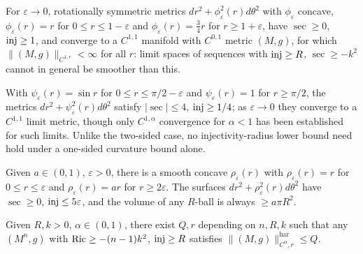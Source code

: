\begin{example}
  \label{ex:pet-ch11-optimality-lower-curvature-example}
  For $\varepsilon\to0$, rotationally symmetric metrics
  $dr^2+\phi_\varepsilon^2(r)d\theta^2$ with $\phi_\varepsilon$ concave,
  $\phi_\varepsilon(r)=r$ for $0\le r\le1-\varepsilon$ and
  $\phi_\varepsilon(r)=\tfrac34r$ for $r\ge1+\varepsilon$, have $\sec\ge0$,
  $\operatorname{inj}\ge1$, and converge to a $C^{1,1}$ manifold with $C^{0,1}$ metric
  $(M,g)$, for which $\|(M,g)\|_{C^{1,r}}<\infty$ for all $r$: limit spaces
  of sequences with $\operatorname{inj}\ge R$, $\sec\ge-k^2$ cannot in general be smoother
  than this.
\end{example}

\begin{example}
  \label{ex:pet-ch11-c11-limit-example}
  With $\psi_\varepsilon(r)=\sin r$ for $0\le r\le\pi/2-\varepsilon$ and
  $\psi_\varepsilon(r)=1$ for $r\ge\pi/2$, the metrics
  $dr^2+\psi_\varepsilon^2(r)d\theta^2$ satisfy $|\sec|\le4$, $\operatorname{inj}\ge1/4$; as
  $\varepsilon\to0$ they converge to a $C^{1,1}$ limit metric, though only
  $C^{1,\alpha}$ convergence for $\alpha<1$ has been established for such
  limits. Unlike the two-sided case, no injectivity-radius lower bound need
  hold under a one-sided curvature bound alone.
\end{example}

\begin{remark}[Exercise 11.4.14]
  \label{rem:pet-ch11-exercise-11-4-14}
  Given $a\in(0,1)$, $\varepsilon>0$, there is a smooth concave
  $\rho_\varepsilon(r)$ with $\rho_\varepsilon(r)=r$ for $0\le r\le\varepsilon$
  and $\rho_\varepsilon(r)=ar$ for $r\ge2\varepsilon$. The surfaces
  $dr^2+\rho_\varepsilon^2(r)d\theta^2$ have $\sec\ge0$, $\operatorname{inj}\le5\varepsilon$,
  and the volume of any $R$-ball is always $\ge a\pi R^2$.
\end{remark}

\begin{theorem}
  \label{thm:pet-ch11-anderson-cheeger-ricci-lower-bound-norm}
  Given $R,k>0$, $\alpha\in(0,1)$, there exist $Q,r$ depending on $n,R,k$
  such that any $(M^n,g)$ with $\operatorname{Ric}\ge-(n-1)k^2$, $\operatorname{inj}\ge R$ satisfies
  $\|(M,g)\|^{\mathrm{har}}_{C^{\alpha},r}\le Q$.
\end{theorem}

